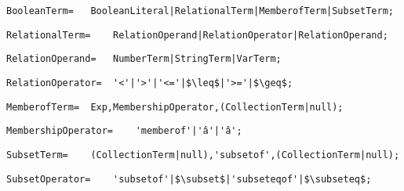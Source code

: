 \documentclass{article}
\begin{document}
    \begin{flushleft}
    \begin{lstlisting}[mathescape=true, breaklines=true]
     BooleanTerm= 	BooleanLiteral|RelationalTerm|MemberofTerm|SubsetTerm;
    \end{lstlisting}
    \end{flushleft}
    \begin{flushleft}
    \begin{lstlisting}[mathescape=true, breaklines=true]
     RelationalTerm= 	RelationOperand|RelationOperator|RelationOperand;
    \end{lstlisting}
    \end{flushleft}
    \begin{flushleft}
    \begin{lstlisting}[mathescape=true, breaklines=true]
     RelationOperand= 	NumberTerm|StringTerm|VarTerm;
    \end{lstlisting}
    \end{flushleft}
    \begin{flushleft}
    \begin{lstlisting}[mathescape=true, breaklines=true]
     RelationOperator= 	'<'|'>'|'<='|$\leq$|'>='|$\geq$;
    \end{lstlisting}
    \end{flushleft}
    \begin{flushleft}
    \begin{lstlisting}[mathescape=true, breaklines=true]
     MemberofTerm= 	Exp,MembershipOperator,(CollectionTerm|null);
    \end{lstlisting}
    \end{flushleft}
    \begin{flushleft}
    \begin{lstlisting}[mathescape=true, breaklines=true]
     MembershipOperator= 	'memberof'|'â'|'â';
    \end{lstlisting}
    \end{flushleft}
    \begin{flushleft}
    \begin{lstlisting}[mathescape=true, breaklines=true]
     SubsetTerm= 	(CollectionTerm|null),'subsetof',(CollectionTerm|null);
    \end{lstlisting}
    \end{flushleft}
    \begin{flushleft}
    \begin{lstlisting}[mathescape=true, breaklines=true]
     SubsetOperator= 	'subsetof'|$\subset$|'subseteqof'|$\subseteq$;
    \end{lstlisting}
    \end{flushleft}
\end{document}
